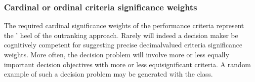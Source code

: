 \documentclass[a4paper,12pt,english]{sphinxhowto}
\begin{document}
\subsubsection{Cardinal or ordinal criteria significance weights}
\label{\detokenize{pearls:cardinal-or-ordinal-criteria-significance-weights}}
\sphinxAtStartPar
The required cardinal significance weights of the performance criteria represent the ’ heel of the outranking approach. Rarely will indeed a decision maker be cognitively competent for suggesting precise decimal\sphinxhyphen{}valued criteria significance weights. More often, the decision problem will involve more or less equally important decision objectives with more or less equi\sphinxhyphen{}significant criteria. A random example of such a decision problem may be generated with the  class.
\def\sphinxLiteralBlockLabel{\label{\detokenize{pearls:objexample}}}
%
\end{document}
